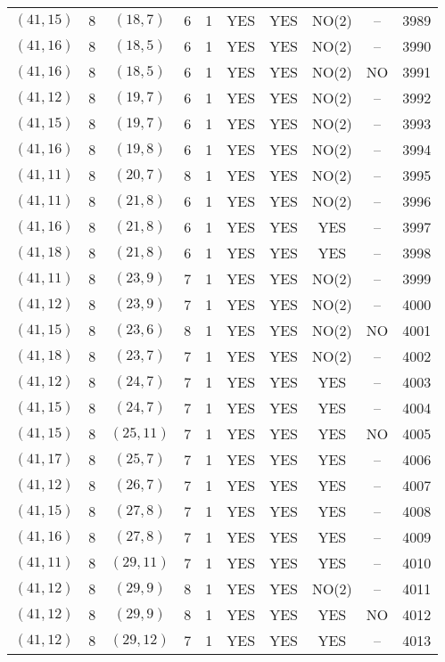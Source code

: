 \begin{longtable}{|c|c|c|c|c|c|c|c|c|c|}
$(41, 15)$ & 8 & $(18, 7)$ & 6 & 1 & YES & YES & NO(2) & -- & 3989\\
$(41, 16)$ & 8 & $(18, 5)$ & 6 & 1 & YES & YES & NO(2) & -- & 3990\\
$(41, 16)$ & 8 & $(18, 5)$ & 6 & 1 & YES & YES & NO(2) & NO & 3991\\
$(41, 12)$ & 8 & $(19, 7)$ & 6 & 1 & YES & YES & NO(2) & -- & 3992\\
$(41, 15)$ & 8 & $(19, 7)$ & 6 & 1 & YES & YES & NO(2) & -- & 3993\\
$(41, 16)$ & 8 & $(19, 8)$ & 6 & 1 & YES & YES & NO(2) & -- & 3994\\
$(41, 11)$ & 8 & $(20, 7)$ & 8 & 1 & YES & YES & NO(2) & -- & 3995\\
$(41, 11)$ & 8 & $(21, 8)$ & 6 & 1 & YES & YES & NO(2) & -- & 3996\\
$(41, 16)$ & 8 & $(21, 8)$ & 6 & 1 & YES & YES & YES & -- & 3997\\
$(41, 18)$ & 8 & $(21, 8)$ & 6 & 1 & YES & YES & YES & -- & 3998\\
$(41, 11)$ & 8 & $(23, 9)$ & 7 & 1 & YES & YES & NO(2) & -- & 3999\\
$(41, 12)$ & 8 & $(23, 9)$ & 7 & 1 & YES & YES & NO(2) & -- & 4000\\
$(41, 15)$ & 8 & $(23, 6)$ & 8 & 1 & YES & YES & NO(2) & NO & 4001\\
$(41, 18)$ & 8 & $(23, 7)$ & 7 & 1 & YES & YES & NO(2) & -- & 4002\\
$(41, 12)$ & 8 & $(24, 7)$ & 7 & 1 & YES & YES & YES & -- & 4003\\
$(41, 15)$ & 8 & $(24, 7)$ & 7 & 1 & YES & YES & YES & -- & 4004\\
$(41, 15)$ & 8 & $(25, 11)$ & 7 & 1 & YES & YES & YES & NO & 4005\\
$(41, 17)$ & 8 & $(25, 7)$ & 7 & 1 & YES & YES & YES & -- & 4006\\
$(41, 12)$ & 8 & $(26, 7)$ & 7 & 1 & YES & YES & YES & -- & 4007\\
$(41, 15)$ & 8 & $(27, 8)$ & 7 & 1 & YES & YES & YES & -- & 4008\\
$(41, 16)$ & 8 & $(27, 8)$ & 7 & 1 & YES & YES & YES & -- & 4009\\
$(41, 11)$ & 8 & $(29, 11)$ & 7 & 1 & YES & YES & YES & -- & 4010\\
$(41, 12)$ & 8 & $(29, 9)$ & 8 & 1 & YES & YES & NO(2) & -- & 4011\\
$(41, 12)$ & 8 & $(29, 9)$ & 8 & 1 & YES & YES & YES & NO & 4012\\
$(41, 12)$ & 8 & $(29, 12)$ & 7 & 1 & YES & YES & YES & -- & 4013\\

\end{longtable}
